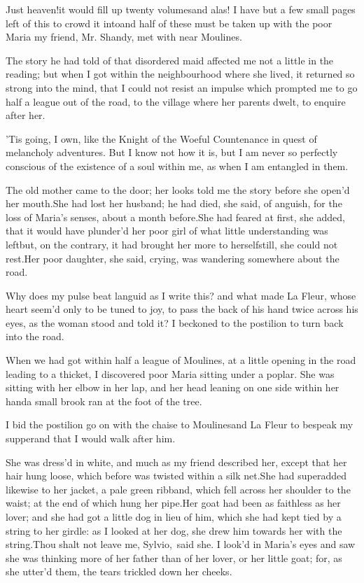 \documentclass[twoside]{article}
\begin{document}
Just heaven!\tskk it would fill up twenty
volumes\tskk and alas! I have but a few
small pages left of this to crowd it
into\tskk and half of these must be taken
up with the poor Maria my friend, Mr.
Shandy, met with near Moulines.

The story he had told of that disordered
maid affected me not a little in the
reading; but when I got within the
neighbourhood where she lived, it returned
so strong into the mind, that I could not
resist an impulse which prompted me to go
half a league out of the road, to the
village where her parents dwelt, to
enquire after her.

’Tis going, I own, like the Knight of the
Woeful Countenance in quest of melancholy
adventures.  But I know not how it is, but
I am never so perfectly conscious of the
existence of a soul within me, as when I
am entangled in them.

The old mother came to the door; her looks
told me the story before she open’d her
mouth.\tskk She had lost her husband; he
had died, she said, of anguish, for the
loss of Maria’s senses, about a month
before.\tskk She had feared at first, she
added, that it would have plunder’d her
poor girl of what little understanding was
left\tskk but, on the contrary, it had
brought her more to herself\tskk still,
she could not rest.\tskk Her poor
daughter, she said, crying, was wandering
somewhere about the road.

Why does my pulse beat languid as I write
this? and what made La Fleur, whose heart
seem’d only to be tuned to joy, to pass
the back of his hand twice across his
eyes, as the woman stood and told it?  I
beckoned to the postilion to turn back
into the road.

When we had got within half a league of
Moulines, at a little opening in the road
leading to a thicket, I discovered poor
Maria sitting under a poplar.  She was
sitting with her elbow in her lap, and her
head leaning on one side within her
hand\tskk a small brook ran at the foot
of the tree.

I bid the postilion go on with the chaise
to Moulines\tskk and La Fleur to bespeak
my supper\tskk and that I would walk
after him.

She was dress’d in white, and much as my
friend described her, except that her hair
hung loose, which before was twisted
within a silk net.\tskk She had superadded
likewise to her jacket, a pale green
ribband, which fell across her shoulder to
the waist; at the end of which hung her
pipe.\tskk Her goat had been as faithless
as her lover; and she had got a little dog
in lieu of him, which she had kept tied by
a string to her girdle: as I looked at her
dog, she drew him towards her with the
string.\tskk \lqq Thou shalt not leave me,
Sylvio,\rqq\ said she.  I look’d in Maria’s
eyes and saw she was thinking more of her
father than of her lover, or her little
goat; for, as she utter’d them, the tears
trickled down her cheeks.
\end{document}
